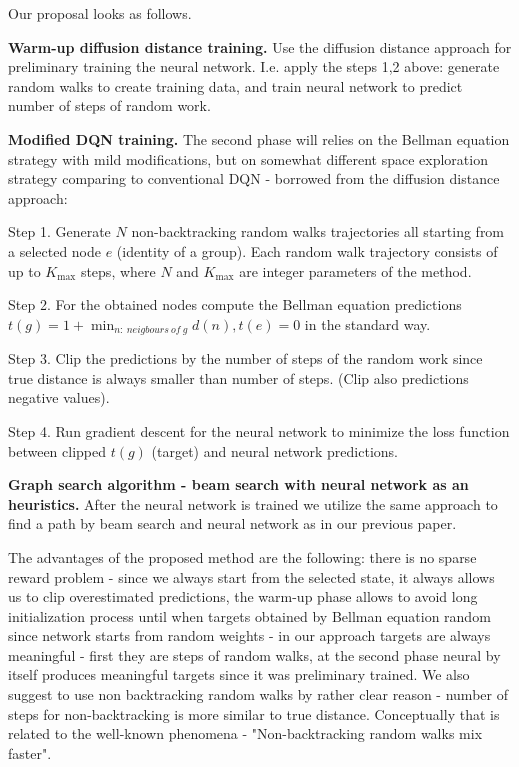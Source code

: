 \documentclass[atmp]{ipart_v1}
\numberwithin{equation}{section}
\theoremstyle{plain}%
\begin{document}
Our proposal looks as follows.

{\bf Warm-up  diffusion distance training. } Use the diffusion distance approach for preliminary training the neural network. I.e. apply the steps 1,2 above: generate random walks to create training data, and train neural network to predict number of steps of random work.

{\bf Modified DQN training. }
The second phase will relies on the Bellman equation strategy with mild modifications, but on somewhat different space exploration strategy comparing to conventional DQN - borrowed from the diffusion distance approach:

Step 1. Generate $N$ non-backtracking random walks trajectories all starting from a selected node $e$ (identity of a group). Each random walk trajectory consists of up to $K_{\text{max}}$ steps, where $N$ and $K_{\text{max}}$ are integer parameters of the method. 

Step 2. For the obtained nodes compute the Bellman equation predictions
$t(g) = 1+\min_{n:~neigbours~of~g} d(n), t(e) =0$ in the standard way. 

Step 3. Clip the predictions by the number of steps of the random work since true distance is always smaller than number of steps. (Clip also predictions negative values). 

Step 4. Run gradient descent for the neural network to minimize the loss function between clipped $t(g)$ (target) and neural network predictions. 

{\bf Graph search algorithm - beam search with neural network as an heuristics. } After the neural network is trained we utilize the same approach to find a path by beam search and neural network as in our previous paper.


The advantages of the proposed method are the following: there is no sparse reward problem - since we always start from the selected state, it always allows us to clip overestimated predictions, the warm-up phase allows to avoid long initialization process until when targets obtained by Bellman equation random since network starts from random weights - in our approach targets are always meaningful - first they are steps of random walks, at the second phase neural by itself produces meaningful targets since it was preliminary trained. We also suggest to use non backtracking random walks by rather clear reason - number of steps for non-backtracking is more similar to true distance. Conceptually that is related to the well-known phenomena - "Non-backtracking random walks mix faster"\cite{alon2007non}.
\end{document}
